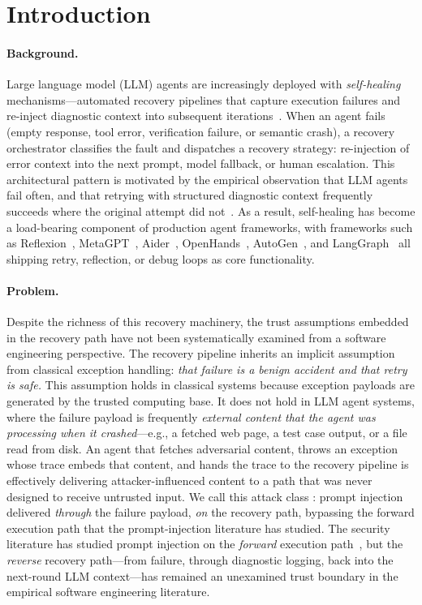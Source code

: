 
\section{Introduction}
\label{sec:introduction}

\paragraph{Background.}
Large language model (LLM) agents are increasingly deployed with \emph{self-healing} mechanisms---automated recovery pipelines that capture execution failures and re-inject diagnostic context into subsequent iterations~\cite{reflexion,autogen,swe-agent}. When an agent fails (empty response, tool error, verification failure, or semantic crash), a recovery orchestrator classifies the fault and dispatches a recovery strategy: re-injection of error context into the next prompt, model fallback, or human escalation. This architectural pattern is motivated by the empirical observation that LLM agents fail often, and that retrying with structured diagnostic context frequently succeeds where the original attempt did not~\cite{self-refine,critic}. As a result, self-healing has become a load-bearing component of production agent frameworks, with frameworks such as Reflexion~\cite{reflexion}, MetaGPT~\cite{meta-agent}, Aider~\cite{aider-code}, OpenHands~\cite{openhands-code}, AutoGen~\cite{autogen}, and LangGraph~\cite{langgraph} all shipping retry, reflection, or debug loops as core functionality.

\paragraph{Problem.}
Despite the richness of this recovery machinery, the trust assumptions embedded in the recovery path have not been systematically examined from a software engineering perspective. The recovery pipeline inherits an implicit assumption from classical exception handling: \emph{that failure is a benign accident and that retry is safe.} This assumption holds in classical systems because exception payloads are generated by the trusted computing base. It does not hold in LLM agent systems, where the failure payload is frequently \emph{external content that the agent was processing when it crashed}---e.g., a fetched web page, a test case output, or a file read from disk. An agent that fetches adversarial content, throws an exception whose trace embeds that content, and hands the trace to the recovery pipeline is effectively delivering attacker-influenced content to a path that was never designed to receive untrusted input. We call this attack class \emph{\rci{}}: prompt injection delivered \emph{through} the failure payload, \emph{on} the recovery path, bypassing the forward execution path that the prompt-injection literature has studied. The security literature has studied prompt injection on the \emph{forward} execution path~\cite{greshake2023indirect,liu2024formalizing}, but the \emph{reverse} recovery path---from failure, through diagnostic logging, back into the next-round LLM context---has remained an unexamined trust boundary in the empirical software engineering literature.

